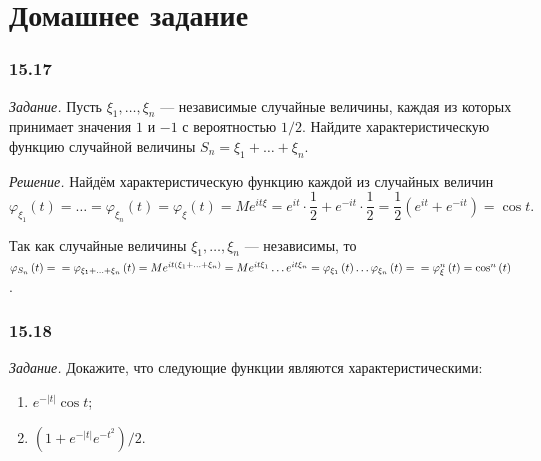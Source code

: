 \section*{Домашнее задание}

\subsubsection*{15.17}

\textit{Задание.} Пусть $ \xi_1, \dotsc, \xi_n$ --- независимые случайные величины, каждая из которых принимает значения $1$ и $- 1$ с вероятностью $1 / 2$.
Найдите характеристическую функцию случайной величины $S_n = \xi_1 + \dotsc + \xi_n$.

\textit{Решение.} Найдём характеристическую функцию каждой из случайных величин
$$ \varphi_{ \xi_1} \left( t \right) =
\dotsc =
\varphi_{ \xi_n} \left( t \right) =
\varphi_{ \xi } \left( t \right) =
Me^{it \xi } =
e^{it} \cdot \frac{1}{2} + e^{- it} \cdot \frac{1}{2} =
\frac{1}{2} \left( e^{it} + e^{- it} \right) =
\cos t.$$

Так как случайные величины $ \xi_1, \dotsc, \xi_n$ --- независимы,
то
$ \varphi_{S_n} \left( t \right) = \\
= \varphi_{ \xi_1 + \dotsc + \xi_n} \left( t \right) =
Me^{it \left( \xi_1 + \dotsc + \xi_n \right) } =
Me^{it \xi_1} \dotsc e^{it \xi_n} =
\varphi_{ \xi_1} \left( t \right) \dotsc \varphi_{ \xi_n} \left( t \right) = \\
= \varphi_{ \xi}^n \left( t \right) =
\cos^n \left( t \right) $.

\subsubsection*{15.18}

\textit{Задание.} Докажите, что следующие функции являются характеристическими:
\begin{enumerate}[label=\alph*)]
\item $e^{- \left| t \right| } \cos t$;
\item $ \left( 1 + e^{- \left| t \right| }e^{- t^2} \right) / 2$.
\end{enumerate}

